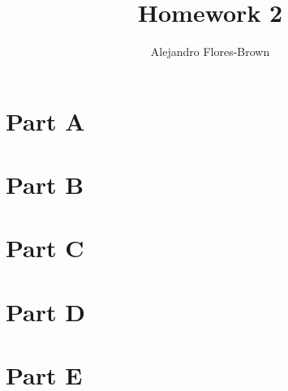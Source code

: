 \documentclass[10pt, letterpaper, parskip = full]{article}
\title{Homework 2}
\author{Alejandro Flores-Brown}
\begin{document}
\maketitle

\section{Part A}

\section{Part B}

\section{Part C}

\section{Part D}

\section{Part E}
\end{document}
